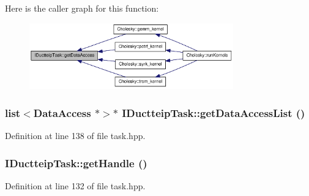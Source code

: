 Here is the caller graph for this function:\nopagebreak
\begin{figure}[H]
\begin{center}
\leavevmode
\includegraphics[width=250pt]{class_i_ductteip_task_a403052cd9aa617520ccf192f79b862b9_icgraph}
\end{center}
\end{figure}
\hypertarget{class_i_ductteip_task_a57d9c01e2a2d7603a46b18b9b7391228}{
\subsubsection[{getDataAccessList}]{\setlength{\rightskip}{0pt plus 5cm}list$<${\bf DataAccess} $\ast$$>$$\ast$ IDuctteipTask::getDataAccessList ()}}
\label{class_i_ductteip_task_a57d9c01e2a2d7603a46b18b9b7391228}


Definition at line 138 of file task.hpp.\hypertarget{class_i_ductteip_task_ab4eb87b3c109c4a5c8a74c928ea3b8b5}{
\subsubsection[{getHandle}]{ IDuctteipTask::getHandle ()}}
\label{class_i_ductteip_task_ab4eb87b3c109c4a5c8a74c928ea3b8b5}


Definition at line 132 of file task.hpp.

